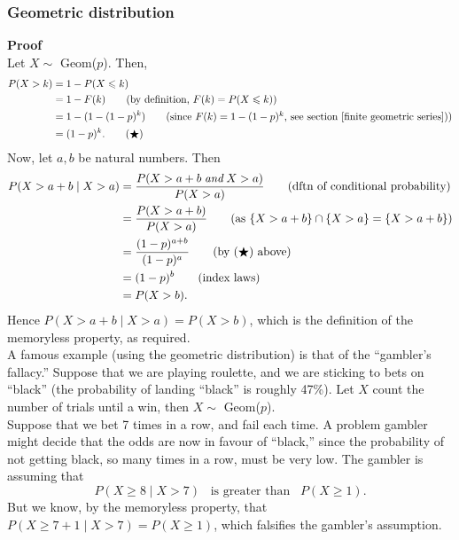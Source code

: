 \subsubsection{Geometric distribution}
\textbf{Proof} \\
Let $X \sim$ Geom($p$). Then,
\begin{align*}
P(X > k) & = 1 - P(X \leq k)  \\
	& = 1 - F(k) \tag{by definition, $F(k) = P(X \leq k)$} \\
	& = 1 - (1-(1-p)^k) \tag{since $F(k) = 1-(1-p)^k$, see section \ref{finite geometric series})} \\
	& = (1-p)^k. \tag{$\bigstar$}
\end{align*}
Now, let $a,b$ be natural numbers. Then
\begin{align*}
P(X > a+b \mid X > a) & = \frac{P(X > a+b \; \textit{and} \; X > a)}{P(X > a)} \tag{dftn of conditional probability} \\
	& = \frac{P(X > a+b)}{P(X > a)} \tag{as $\set{X > a+b} \cap \set{X > a} = \set{X > a+b}$} \\
	& = \frac{(1-p)^{a+b}}{(1-p)^a} \tag{by ($\bigstar$) above} \\
	& = (1-p)^b \tag{index laws} \\
	& = P(X > b).
\end{align*}
Hence $P(X > a+b \mid X > a) = P(X > b)$, which is the definition of the memoryless property, as required. \\

\noindent A famous example (using the geometric distribution) is that of the ``gambler's fallacy.'' Suppose that we are playing roulette, and we are sticking to bets on ``black'' (the probability of landing ``black'' is roughly 47\%). Let $X$ count the number of trials until a win, then $X \sim$ Geom($p$).\\

\noindent Suppose that we bet 7 times in a row, and fail each time. A problem gambler might decide that the odds are now in favour of ``black,'' since the probability of not getting black, so many times in a row, must be very low. The gambler is assuming that
\[
P(X \geq 8 \mid X > 7) \;\;\; \text{is greater than} \;\;\; P(X \geq 1).
\]
But we know, by the memoryless property, that $P(X \geq 7+1 \mid X > 7) = P(X \geq 1)$, which falsifies the gambler's assumption.

